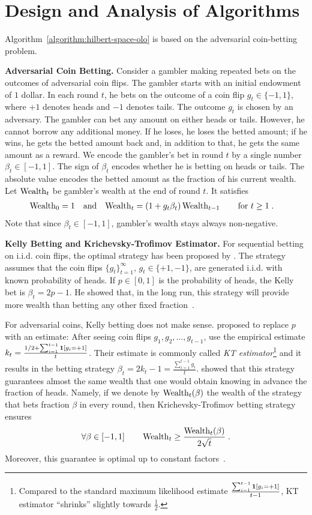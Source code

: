 \section{Design and Analysis of Algorithms}

Algorithm~\ref{algorithm:hilbert-space-olo}
is based on the adversarial coin-betting problem.

\textbf{Adversarial Coin Betting.}
Consider a gambler making repeated bets on the outcomes of adversarial coin
flips. The gambler starts with an initial endowment of $1$ dollar. In each
round $t$, he bets on the outcome of a coin flip $g_t \in \{-1,1\}$, where $+1$
denotes heads and $-1$ denotes tails.  The outcome $g_t$ is chosen by an
adversary.  The gambler can bet any amount on either heads or tails. However,
he cannot borrow any additional money. If he loses, he loses the betted amount;
if he wins, he gets the betted amount back and, in addition to that, he gets
the same amount as a reward.  We encode the gambler's bet in round $t$ by a
single number $\beta_t \in [-1,1]$. The sign of $\beta_t$ encodes whether he is
betting on heads or tails. The absolute value encodes the betted amount as the
fraction of his current wealth.  Let $\operatorname{Wealth}_t$ be gambler's wealth at the end
of round $t$. It satisfies
\begin{align}
\label{equation:wealth-recurrence}
\operatorname{Wealth}_0 & = 1 &
& \text{and} &
\operatorname{Wealth}_t & = (1 + g_t \beta_t) \operatorname{Wealth}_{t-1} \qquad \text{for $t \ge 1$} \; .
\end{align}
Note that since $\beta_t \in [-1,1]$, gambler's wealth stays always
non-negative.

\textbf{Kelly Betting and Krichevsky-Trofimov Estimator.}
For sequential betting on i.i.d. coin flips, the optimal strategy has been
proposed by \citet{Kelly-1956}.  The strategy assumes that the coin flips
$\{g_t\}_{t=1}^\infty$, $g_t \in \{+1,-1\}$, are generated i.i.d. with known
probability of heads. If $p \in [0,1]$ is the probability of heads, the Kelly
bet is $\beta_t = 2p - 1$. He showed that, in the long run, this strategy will
provide more wealth than betting any other fixed fraction~\cite{Kelly-1956}.

For adversarial coins, Kelly betting does not make sense.
\citet{Krichevsky-Trofimov-1981} proposed to replace $p$ with an estimate:
After seeing coin flips $g_1, g_2, \dots, g_{t-1}$, use the empirical
estimate $k_t = \frac{1/2 + \sum_{i=1}^{t-1} \mathbf{1}[g_i = +1]}{t}$. Their
estimate is commonly called \emph{KT estimator}\footnote{Compared to the
standard maximum likelihood estimate $\frac{\sum_{i=1}^{t-1} \mathbf{1}[g_i =
+1]}{t-1}$, KT estimator ``shrinks'' slightly towards $\frac{1}{2}$.} and it
results in the betting strategy $\beta_t = 2k_t - 1 = \tfrac{\sum_{i=1}^{t-1}
g_i}{t}$.  \citeauthor{Krichevsky-Trofimov-1981} showed that this strategy
guarantees almost the same wealth that one would obtain knowing in advance the
fraction of heads. Namely, 
if we denote by $\operatorname{Wealth}_t(\beta)$ the wealth of the strategy that bets fraction
$\beta$ in every round, then Krichevsky-Trofimov betting strategy ensures
$$
\forall \beta \in [-1,1] \qquad \operatorname{Wealth}_t \ge \frac{\operatorname{Wealth}_t(\beta)}{2\sqrt{t}} \; .
$$
Moreover, this guarantee is optimal up to constant factors~\citep{Cesa-Bianchi-Lugosi-2006}.


